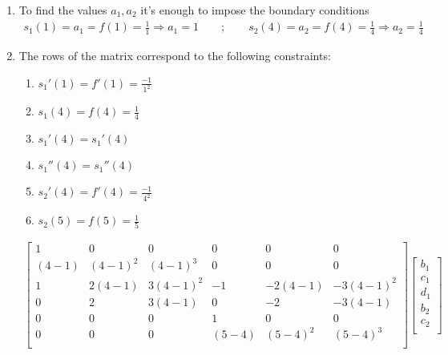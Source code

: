 \documentclass{article}
\begin{document}
    
    \begin{enumerate}[label=(\roman*)]
        \item To find the values $a_1,a_2$ it's enough to impose the boundary conditions
        \begin{align}
            s_1(1)=a_1 = f(1)=\frac{1}{1} \Longrightarrow a_1 = 1 \qquad ; \qquad s_2(4)=a_2=f(4)=\frac{1}{4} \Longrightarrow a_2 = \frac{1}{4}
        \end{align}
        \item The rows of the matrix correspond to the following constraints:
        \begin{enumerate}[label=\arabic*.]
            \item $s_1'(1)=f'(1)=\frac{-1}{1^2}$
            \item $s_1(4)=f(4)=\frac{1}{4}$
            \item $s_1'(4)=s_1'(4)$
            \item $s_1''(4)=s_1''(4)$
            \item $s_2'(4)=f'(4)=\frac{-1}{4^2}$
            \item $s_2(5)=f(5)=\frac{1}{5}$
        \end{enumerate}
        \begin{align}
            \begin{bmatrix}
            1 & 0 & 0 & 0 & 0 & 0 \\
            (4-1) & (4-1)^2 & (4-1)^3 & 0 & 0 & 0\\
             1 & 2(4-1) & 3(4-1)^2 & -1 & -2(4-1) & -3(4-1)^2 \\
            0 & 2 & 3(4-1) & 0 & -2 & -3(4-1) \\
            0 & 0 & 0 & 1 & 0 & 0 \\
            0 & 0 & 0 & (5-4) & (5-4)^2 & (5-4)^3 \\
            \end{bmatrix}
            \begin{bmatrix}
                b_1 \\
                c_1 \\
                d_1 \\
                b_2 \\
                c_2 \\

\end{bmatrix}
\end{align}
\end{enumerate}
\end{document}
